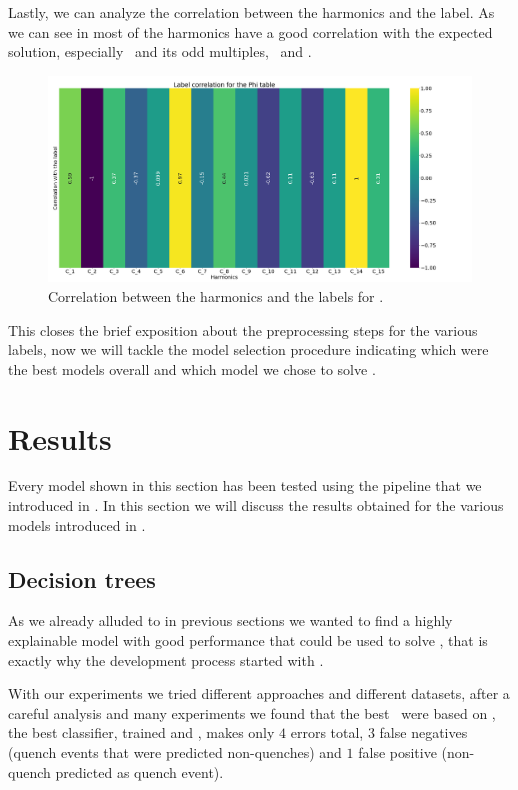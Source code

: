 Lastly, we can analyze the correlation between the harmonics and the label. As we can see in
 most of the harmonics have a good correlation with the expected solution,
especially \phin[2]\ and its odd multiples, \phin[1]\ and \phin[12].
\begin{figure}[!ht]
	\centering
	\includegraphics[width=\linewidth]{img/Phi_label_corr.png}
	\caption{Correlation between the harmonics and the labels for \phin.} \label{fig:phi-lcorr}
\end{figure}

\medskip

This closes the brief exposition about the preprocessing steps for the various labels, now we will
tackle the model selection procedure indicating which were the best models overall and which model
we chose to solve \qrp.

\section{Results}
\label{sec:results-qrp}
Every model shown in this section has been tested using the pipeline that we introduced in
. In this section we will discuss the results obtained for the various models
introduced in .

\subsection{Decision trees}
\label{sec:qrp-dt}
As we already alluded to in previous sections we wanted to find a highly explainable model with good
performance that could be used to solve \qrp, that is exactly why the development process started
with \dts.

With our experiments we tried different approaches and different datasets, after a careful analysis
and many experiments we found that the best \dts\ were based on \an, the best classifier, trained
\an[2] and \an[12], makes only $4$ errors total, $3$ false negatives (quench events that were
predicted non-quenches) and $1$ false positive (non-quench predicted as quench event).

